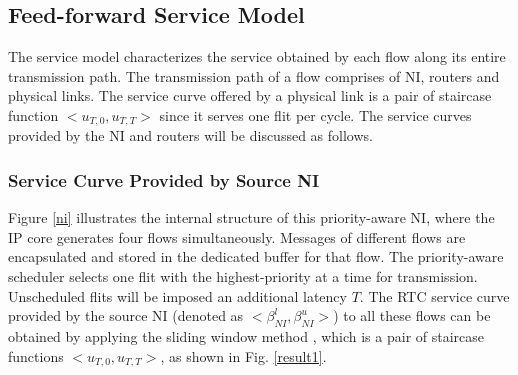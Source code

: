 \documentclass[preprint]{elsarticle}
\begin{document}
\subsection{Feed-forward Service Model}\label{sm}
The service model characterizes the service obtained by each flow along its entire transmission path. The transmission path of a flow comprises of NI, routers and physical links. The service curve offered by a physical link is a pair of staircase function $<u_{T,0},u_{T,T}>$ since it serves one flit per cycle. The service curves provided by the NI and routers will be discussed as follows.

\subsubsection{Service Curve Provided by Source NI}
Figure \ref{ni} illustrates the internal structure of this priority-aware NI, where the IP core generates four flows simultaneously. Messages of different flows are encapsulated and stored in the dedicated buffer for that flow. The priority-aware scheduler selects one flit with the highest-priority at a time for transmission. Unscheduled flits will be imposed an additional latency $T$. The RTC service curve provided by the source NI (denoted as $<\beta^l_{NI},\beta^u_{NI}>$) to all these flows can be obtained by applying the sliding window method \cite{1253607}, which is a pair of staircase functions $<u_{T,0},u_{T,T}>$, as shown in Fig. \ref{result1}.
\end{document}
